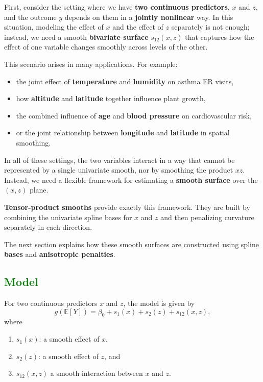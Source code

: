 \documentclass[
  letterpaper,
  DIV=11,
  numbers=noendperiod]{scrreprt}
\providecommand{\tightlist}{%
  \setlength{\itemsep}{0pt}\setlength{\parskip}{0pt}}\usepackage{longtable,booktabs,array}
\begin{document}
First, consider the setting where we have \textbf{two continuous
predictors}, \(x\) and \(z\), and the outcome \(y\) depends on them in a
\textbf{jointly nonlinear} way. In this situation, modeling the effect
of \(x\) and the effect of \(z\) separately is not enough; instead, we
need a smooth \textbf{bivariate surface} \(s_{12}(x,z)\) that captures
how the effect of one variable changes smoothly across levels of the
other.

This scenario arises in many applications. For example:

\begin{itemize}
\tightlist
\item
  the joint effect of \textbf{temperature} and \textbf{humidity} on
  asthma ER visits,
\item
  how \textbf{altitude} and \textbf{latitude} together influence plant
  growth,
\item
  the combined influence of \textbf{age} and \textbf{blood pressure} on
  cardiovascular risk,
\item
  or the joint relationship between \textbf{longitude} and
  \textbf{latitude} in spatial smoothing.
\end{itemize}

In all of these settings, the two variables interact in a way that
cannot be represented by a single univariate smooth, nor by smoothing
the product \(xz\). Instead, we need a flexible framework for estimating
a \textbf{smooth surface} over the \((x,z)\) plane.

\textbf{Tensor-product smooths} provide exactly this framework. They are
built by combining the univariate spline bases for \(x\) and \(z\) and
then penalizing curvature separately in each direction.

The next section explains how these smooth surfaces are constructed
using spline \textbf{bases} and \textbf{anisotropic penalties}.

\hypertarget{section-32}{%
\subsection*{\texorpdfstring{\textcolor{green}{Model}}{}}\label{section-32}}

For two continuous predictors \(x\) and \(z\), the model is given by \[
g(\mathbb{E}[Y]) = \beta_0 + s_1(x) + s_2(z) + s_{12}(x,z),
\] where

\begin{enumerate}
\def\labelenumi{\arabic{enumi}.}
\tightlist
\item
  \(s_1(x)\): a smooth effect of \(x\).
\item
  \(s_2(z)\): a smooth effect of \(z\), and
\item
  \(s_{12}(x,z)\) a smooth interaction between \(x\) and \(z\).
\end{enumerate}
\end{document}
